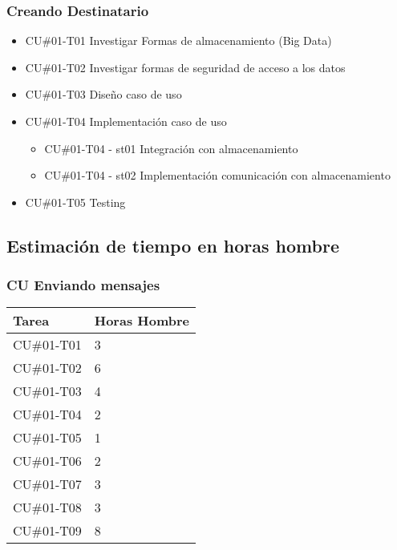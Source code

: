 \documentclass[a4paper, 11pt]{article}
\begin{document}
\subsubsection{Creando Destinatario}
\begin{itemize}
\item{CU\#01-T01} Investigar Formas de almacenamiento (Big Data)
\item{CU\#01-T02} Investigar formas de seguridad de acceso a los datos
\item{CU\#01-T03} Dise\~no caso de uso
\item{CU\#01-T04} Implementaci\'on caso de uso
\begin{itemize}
\item{CU\#01-T04 - st01} Integraci\'on con almacenamiento
\item{CU\#01-T04 - st02} Implementaci\'on comunicaci\'on con almacenamiento
\end{itemize}
\item{CU\#01-T05} Testing
\end{itemize}
\subsection{Estimaci\'on de tiempo en horas hombre}


\subsubsection{CU Enviando mensajes}
\begin{tabular}{| p{5cm} | p{5cm} |}

\hline
\bf{Tarea} & \bf{Horas Hombre} \\ \hline \hline
CU\#01-T01 & 3 \\ \hline
CU\#01-T02 & 6 \\ \hline
CU\#01-T03 & 4 \\ \hline
CU\#01-T04 & 2 \\ \hline
CU\#01-T05 & 1 \\ \hline
CU\#01-T06 & 2 \\ \hline
CU\#01-T07 & 3 \\ \hline
CU\#01-T08 & 3 \\ \hline
CU\#01-T09 & 8 \\ \hline
\end{tabular}
\end{document}
